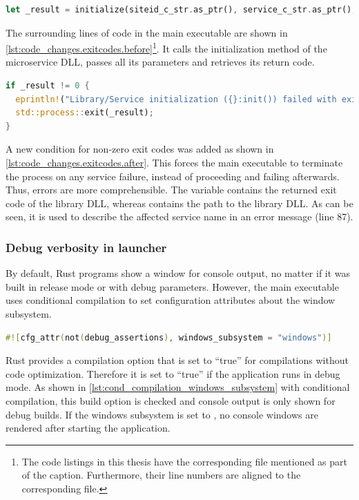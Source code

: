 \begin{lstlisting}[label=lst:code_changes.exitcodes.before, caption={Former code snippet from main executable for calling the microservice library code in Rust (\textit{/Microservices/OpenTwin/src/main.rs})}, language=rust, firstnumber=85]
let _result = initialize(siteid_c_str.as_ptr(), service_c_str.as_ptr(), db_c_str.as_ptr(), dir_c_str.as_ptr());
\end{lstlisting}
The surrounding lines of code in the main executable are shown in \autoref{lst:code_changes.exitcodes.before}\footnote{The code listings in this thesis have the corresponding file mentioned as part of the caption. Furthermore, their line numbers are aligned to the corresponding file.}. It calls the initialization method of the microservice \ac{DLL}, passes all its parameters and retrieves its return code.

\begin{lstlisting}[label=lst:code_changes.exitcodes.after, caption={Code changes in Rust main executable for additional treatment of exit codes (\textit{/Microservices/OpenTwin/src/main.rs})}, language=rust, firstnumber=86]
if _result != 0 {
  eprintln!("Library/Service initialization ({}:init()) failed with exit code {}", lib_path, _result);
  std::process::exit(_result);
}
\end{lstlisting}
A new condition for non-zero exit codes was added as shown in \autoref{lst:code_changes.exitcodes.after}. This forces the main executable to terminate the process on any service failure, instead of proceeding and failing afterwards. Thus, errors are more comprehensible. The variable  contains the returned exit code of the library \ac{DLL}, whereas  contains the path to the library \ac{DLL}. As can be seen, it is used to describe the affected service name in an error message (line 87).
 
\subsubsection*{Debug verbosity in launcher}
By default, Rust programs show a window for console output, no matter if it was built in release mode or with debug parameters. However, the main executable uses conditional compilation to set configuration attributes about the window subsystem.
\begin{lstlisting}[label=lst:cond_compilation_windows_subsystem, caption={Conditional compilation for disabling console output in non-debug builds (\textit{/Microservices/OpenTwin/src/main.rs})}, language=rust, firstnumber=2]
#![cfg_attr(not(debug_assertions), windows_subsystem = "windows")]
\end{lstlisting}
Rust provides a compilation option  that is set to \enquote{true} for compilations without code optimization\cite{Rust.20230209}. Therefore it is set to \enquote{true} if the application runs in debug mode. As shown in \autoref{lst:cond_compilation_windows_subsystem} with conditional compilation, this build option is checked and console output is only shown for debug builds. If the windows subsystem is set to , no console windows are rendered after starting the application.

